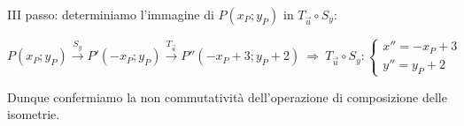 III passo: determiniamo l'immagine di \(P(x_P;y_P)\) in 
\(T_{\vec{u}}\circ S_y\):

\[P(x_P;y_P)\overset{S_y}\rightarrow P'(-x_P;y_P) 
\overset{T_{\vec{u}}}\rightarrow P''(-x_P+3;y_P+2)\:\Rightarrow\: 
T_{\vec{u}}\circ S_y:\begin{cases}x''=-x_P+3\\ y''=y_P+2\end{cases}\]

Dunque confermiamo la non commutatività dell'operazione di 
composizione delle isometrie.

% 
% 
% 
% 

